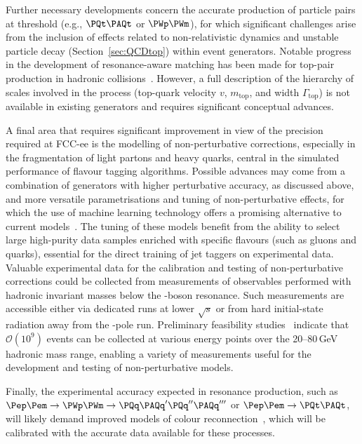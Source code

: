 Further necessary developments concern the accurate production of particle pairs at threshold 
(e.g., $\ttbar$ or $\PWp\PWm$), 
for which significant challenges arise from the inclusion of effects related to non-relativistic dynamics 
and unstable particle decay (Section~\ref{sec:QCDtop}) within event generators.
Notable progress in the development of resonance-aware matching has been made for top-pair production in 
hadronic collisions~\cite{Jezo:2015aia,Frederix:2016rdc,Bach:2017ggt}. 
However, a full description of the hierarchy of scales involved in the process
(top-quark velocity $v$, $m_\text{top}$, and width $\Gamma_\text{top}$) 
is not available in existing generators and requires significant conceptual advances.

A final area that requires significant improvement in view of the precision required at FCC-ee is the modelling of non-perturbative corrections,
especially in the fragmentation of light partons and heavy quarks, 
central in the simulated performance of flavour tagging algorithms.
Possible advances may come from a combination of generators with higher perturbative accuracy, as discussed above, 
and more versatile parametrisations and tuning of non-perturbative effects, 
for which the use of machine learning technology offers a promising alternative to current models~\cite{Ilten:2022jfm,Ghosh:2022zdz,Chan:2023ume}.
The tuning of these models benefit from the ability to select large high-purity data samples enriched with specific flavours
(such as gluons and \PQb quarks), essential for the direct training of jet taggers on experimental data.
Valuable experimental data for the calibration and testing of non-perturbative corrections could be collected 
from measurements of observables performed with hadronic invariant masses below the \PZ-boson resonance. 
Such measurements are accessible either via dedicated runs at lower $\sqrt{s}$ 
or from hard initial-state radiation away from the \PZ-pole run. 
Preliminary feasibility studies~\cite{verbytskyi24,verbytskyi25} indicate that $\mathcal{O}(10^9)$ events 
can be collected at various energy points over the 20--80\,GeV hadronic mass range, 
enabling a variety of measurements useful for the development and testing of non-perturbative models.

Finally, the experimental accuracy expected in resonance production,
such as $\epem \to \PWp\PWm \to \PQq\PAQq^\prime \PQq^{\prime\prime}\PAQq^{\prime\prime\prime}$ or $\epem \to \ttbar$, 
will likely demand improved models of colour reconnection~\cite{Christiansen:2015yca}, 
which will be calibrated with the accurate data available for these processes.

